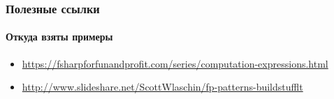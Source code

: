 \documentclass[xetex,mathserif,serif]{beamer}
\begin{document}
    \begin{frame}
        \frametitle{Полезные ссылки}
        \framesubtitle{Откуда взяты примеры}
        \begin{small}
            \begin{itemize}
                \item \url{https://fsharpforfunandprofit.com/series/computation-expressions.html}
                \item \url{http://www.slideshare.net/ScottWlaschin/fp-patterns-buildstufflt}
            \end{itemize}
        \end{small}
    \end{frame}
\end{document}
